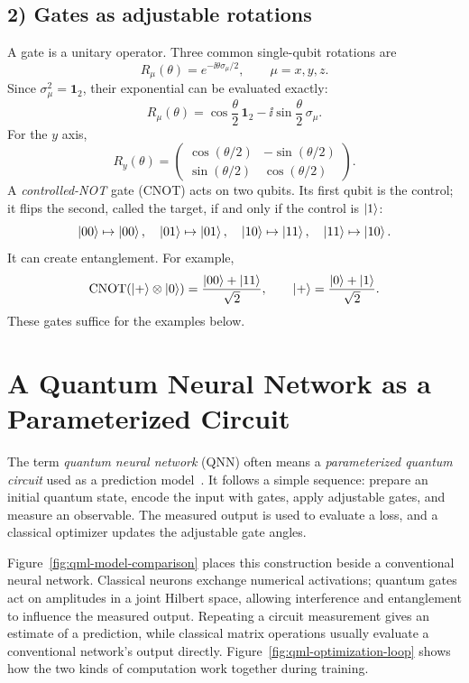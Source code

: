 \subsection*{2) Gates as adjustable rotations}
A gate is a unitary operator. Three common single-qubit rotations are
\begin{equation}
 R_\mu(\theta)=e^{-\ii\theta\sigma_\mu/2},\qquad \mu=x,y,z.
\end{equation}
Since $\sigma_\mu^2=\mathbf1_2$, their exponential can be evaluated exactly:
\begin{equation}
 R_\mu(\theta)=\cos\frac\theta2\,\mathbf1_2
 -\ii\sin\frac\theta2\,\sigma_\mu.
\end{equation}
For the $y$ axis,
\begin{equation}
 R_y(\theta)=\begin{pmatrix}
 \cos(\theta/2)&-\sin(\theta/2)\\
 \sin(\theta/2)&\cos(\theta/2)
 \end{pmatrix}.
\end{equation}
A \emph{controlled-NOT} gate (CNOT) acts on two qubits. Its first qubit is the control; it flips the second, called the target, if and only if the control is $\left|1\right\rangle$:
\begin{equation}
\left|00\right\rangle\mapsto\left|00\right\rangle,\quad\left|01\right\rangle\mapsto\left|01\right\rangle,\quad
\left|10\right\rangle\mapsto\left|11\right\rangle,\quad\left|11\right\rangle\mapsto\left|10\right\rangle.
\end{equation}
It can create entanglement. For example,
\begin{equation}
\mathrm{CNOT}(\left|+\right\rangle\otimes\left|0\right\rangle)=
\frac{\left|00\right\rangle+\left|11\right\rangle}{\sqrt2},\qquad
\left|+\right\rangle=\frac{\left|0\right\rangle+\left|1\right\rangle}{\sqrt2}.
\end{equation}
These gates suffice for the examples below.

\section{A Quantum Neural Network as a Parameterized Circuit}
The term \emph{quantum neural network} (QNN) often means a \emph{parameterized quantum circuit} used as a prediction model~\cite{Cerezo2021,Abbas2021}. It follows a simple sequence: prepare an initial quantum state, encode the input with gates, apply adjustable gates, and measure an observable. The measured output is used to evaluate a loss, and a classical optimizer updates the adjustable gate angles.

Figure~\ref{fig:qml-model-comparison} places this construction beside a conventional neural network. Classical neurons exchange numerical activations; quantum gates act on amplitudes in a joint Hilbert space, allowing interference and entanglement to influence the measured output. Repeating a circuit measurement gives an estimate of a prediction, while classical matrix operations usually evaluate a conventional network's output directly. Figure~\ref{fig:qml-optimization-loop} shows how the two kinds of computation work together during training.

